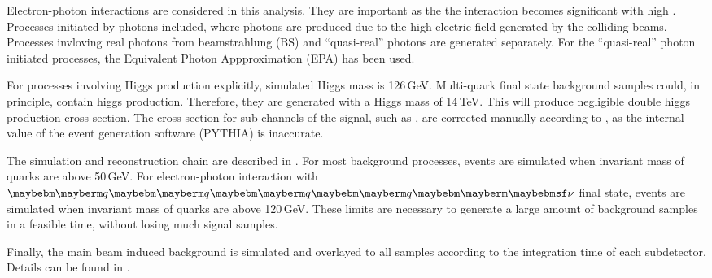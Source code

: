 Electron-photon interactions are considered in this analysis. They are important as the the interaction becomes significant with high \sqrtS. Processes initiated by photons included, where photons are produced due to the high electric field generated by the colliding beams. Processes invloving real photons from beamstrahlung (BS) and ``quasi-real'' photons are generated separately. For the ``quasi-real'' photon initiated processes, the Equivalent Photon Appproximation (EPA) has been used.


For processes involving Higgs production explicitly, simulated Higgs mass is 126\,GeV. Multi-quark final state background samples could, in principle, contain higgs production. Therefore, they are generated with a Higgs mass of 14\,TeV. This will produce negligible double higgs production cross section. The cross section for sub-channels of the signal, such as \eeToHHbbWW, are corrected manually according to \cite{Dittmaier:2012vm}, as the internal value of the event generation software (PYTHIA) is inaccurate.



The simulation and reconstruction chain are described in . For most background processes, events are simulated when invariant mass of quarks are above 50\,GeV. For electron-photon interaction with $\Pquark\Pquark\Pquark\Pquark\Pnu$ final state, events are simulated when invariant mass of quarks are above 120\,GeV. These limits are necessary to generate a large amount of background samples in a feasible time, without losing much signal samples.

Finally, the main beam induced background \ggHad is simulated and overlayed to all samples according to the integration time of each subdetector. Details can be found in \Section{}.

